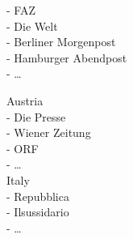 \documentclass[9pt,mathserif,unknownkeysallowed,xcolor=dvipsnames]{beamer}
\begin{document}
\begin{frame}{}
\begin{minipage}{.56\textwidth}
{- FAZ \\
- Die Welt \\
- Berliner Morgenpost \\
- Hamburger Abendpost \\
- \ldots \\
}
\end{minipage} \hfill
%
\begin{minipage}{.3\textwidth}
Austria \\
- Die Presse \\
- Wiener Zeitung \\
- ORF \\
- \ldots \\

Italy \\
- Repubblica \\
- Ilsussidario \\
- \ldots \\


\end{minipage}
\end{frame}
\end{document}
